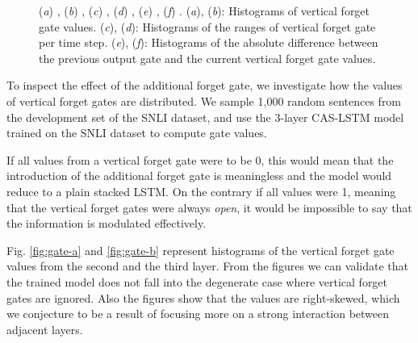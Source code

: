 \documentclass[wcp]{jmlr}
\begin{document}
    \begin{figure}[t]
        \centering
        \quad
        \par\bigskip
        \quad
        \par\bigskip
        \quad
        \caption{
            (\textit{a}) , (\textit{b}) , (\textit{c}) ,
            (\textit{d}) , (\textit{e}) ,
            (\textit{f}) .
            (\textit{a}), (\textit{b}): Histograms of vertical forget gate values.
            (\textit{c}), (\textit{d}): Histograms of the ranges of vertical forget gate per time step.
            (\textit{e}), (\textit{f}): Histograms of the absolute difference between the previous output gate and the current vertical forget gate values.
        }
        \label{fig:gate-analysis}
    \end{figure}
    
    To inspect the effect of the additional forget gate, we investigate how the values of vertical forget gates are distributed.
    We sample 1,000 random sentences from the development set of the SNLI dataset, and use the 3-layer CAS-LSTM model trained on the SNLI dataset to compute gate values.
    
    If all values from a vertical forget gate  were to be 0, this would mean that the introduction of the additional forget gate is meaningless and the model would reduce to a plain stacked LSTM.
    On the contrary if all values were 1, meaning that the vertical forget gates were always \textit{open}, it would be impossible to say that the information is modulated effectively.
    
    Fig. \ref{fig:gate-a} and \ref{fig:gate-b} represent histograms of the vertical forget gate values from the second and the third layer.
    From the figures we can validate that the trained model does not fall into the degenerate case where vertical forget gates are ignored.
    Also the figures show that the values are right-skewed, which we conjecture to be a result of focusing more on a strong interaction between adjacent layers.
    
\end{document}
